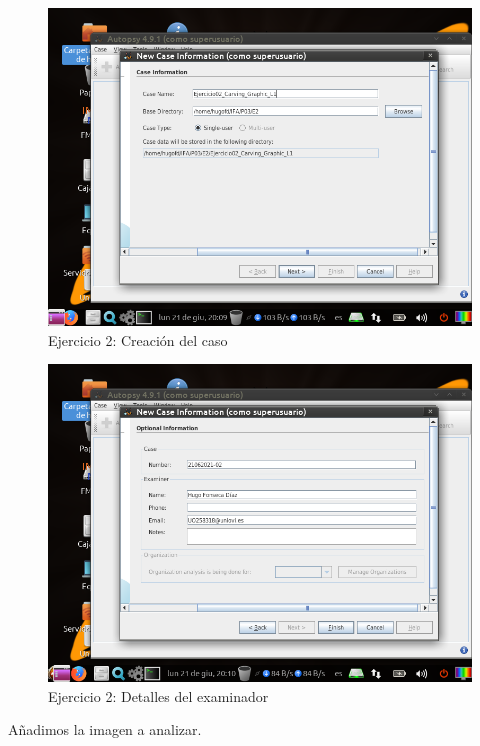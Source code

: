 \documentclass[11pt]{article}
\begin{document}
\begin{figure}[H]
  \caption{Ejercicio 2: Creación del caso}
  \centering
  \includegraphics[scale=0.7]{e2-1.png}
\end{figure}

\begin{figure}[H]
  \caption{Ejercicio 2: Detalles del examinador}
  \centering
  \includegraphics[scale=0.7]{e2-2.png}
\end{figure}

Añadimos la imagen a analizar.
\end{document}
